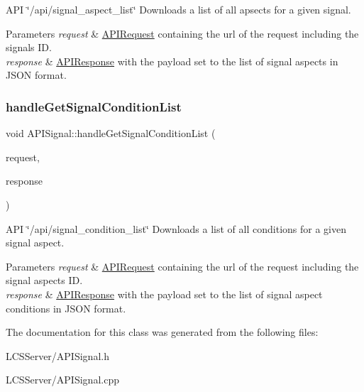 A\+PI \char`\"{}/api/signal\+\_\+aspect\+\_\+list\char`\"{} Downloads a list of all apsects for a given signal. 
\begin{DoxyParams}{Parameters}
{\em request} & \hyperlink{class_a_p_i_request}{A\+P\+I\+Request} containing the url of the request including the signal\textquotesingle{}s ID. \\
\hline
{\em response} & \hyperlink{class_a_p_i_response}{A\+P\+I\+Response} with the payload set to the list of signal aspects in J\+S\+ON format. \\
\hline
\end{DoxyParams}
\mbox{\label{class_a_p_i_signal_a0d698251dabf70472533fa99e4f53e48}} 
\subsubsection{\texorpdfstring{handle\+Get\+Signal\+Condition\+List}{handleGetSignalConditionList}}
{\footnotesize\ttfamily void A\+P\+I\+Signal\+::handle\+Get\+Signal\+Condition\+List (\begin{DoxyParamCaption}\item[{const \hyperlink{class_a_p_i_request}{A\+P\+I\+Request} \&}]{request,  }\item[{\hyperlink{class_a_p_i_response}{A\+P\+I\+Response} $\ast$}]{response }\end{DoxyParamCaption})\hspace{0.3cm}{\ttfamily [slot]}}

A\+PI \char`\"{}/api/signal\+\_\+condition\+\_\+list\char`\"{} Downloads a list of all conditions for a given signal aspect. 
\begin{DoxyParams}{Parameters}
{\em request} & \hyperlink{class_a_p_i_request}{A\+P\+I\+Request} containing the url of the request including the signal aspect\textquotesingle{}s ID. \\
\hline
{\em response} & \hyperlink{class_a_p_i_response}{A\+P\+I\+Response} with the payload set to the list of signal aspect conditions in J\+S\+ON format. \\
\hline
\end{DoxyParams}


The documentation for this class was generated from the following files\+:\begin{DoxyCompactItemize}
\item 
L\+C\+S\+Server/A\+P\+I\+Signal.\+h\item 
L\+C\+S\+Server/A\+P\+I\+Signal.\+cpp\end{DoxyCompactItemize}
